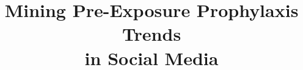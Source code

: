 \documentclass[conference]{IEEEtran}
\begin{document}
%
\title{Mining Pre-Exposure Prophylaxis Trends \\ in Social Media}




% 
\end{document}
